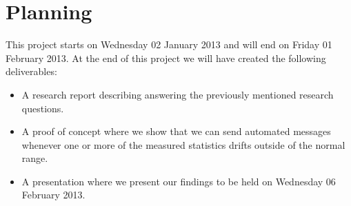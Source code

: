 \documentclass{article}
\begin{document}
\section{Planning}
This project starts on Wednesday 02 January 2013 and will end on Friday 01 February 2013. 
At the end of this project we will have created the following deliverables:
\begin{itemize}
\item A research report describing answering the previously mentioned research questions.
\item A proof of concept where we show that we can send automated messages whenever one or more of the measured statistics drifts outside of the normal range.
\item A presentation where we present our findings to be held on Wednesday 06 February 2013.
\end{itemize}




\end{document}
